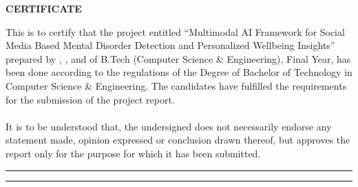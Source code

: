 \vspace*{\fill} %



\begin{center}
 \LARGE {\bf \uppercase{Certificate}}
\end{center}

\vspace{1\baselineskip}

\noindent
This is to certify that the project entitled “Multimodal AI Framework for Social Media Based Mental Disorder Detection and Personalized Wellbeing Insights” prepared by ,  ,  and  of B.Tech (Computer Science \& Engineering), Final Year, has been done according to the regulations of the Degree of
Bachelor of Technology in Computer Science \& Engineering. The candidates have
fulfilled the requirements for the submission of the project report.\\\\
It is to be understood that, the undersigned does not necessarily endorse any statement made, opinion expressed or conclusion drawn thereof, but approves the report only for the purpose for which it has been submitted.

\hspace{\baselineskip}

\vspace{3\baselineskip}
\begin{minipage}[c]{0.45\textwidth}
\centering
\hrule 
\vspace{0.5\baselineskip}
\end{minipage}
\hspace{1.0\baselineskip}
\begin{minipage}[c]{0.45\textwidth}
\centering
\hrule 
\vspace{0.5\baselineskip}
\end{minipage}
\vspace{\baselineskip}
\hspace{1.0\baselineskip}

